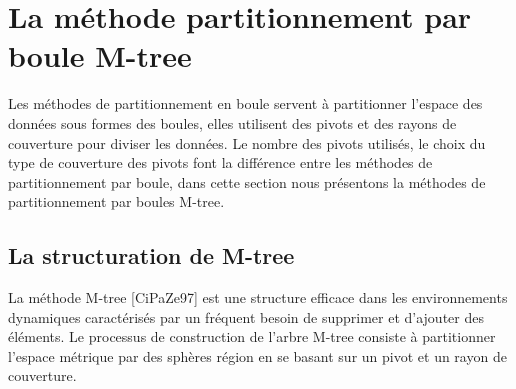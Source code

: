 \section{La méthode partitionnement par boule M-tree}
Les méthodes de partitionnement en boule servent à partitionner l'espace des données sous formes des boules, elles utilisent des pivots et des rayons de couverture pour diviser les données. Le nombre des pivots utilisés, le choix du type de couverture des pivots font la différence entre les méthodes de partitionnement par boule, dans cette section nous présentons la méthodes de partitionnement par boules M-tree.

\subsection{La structuration de M-tree}
La méthode M-tree [CiPaZe97] est une structure efficace dans les environnements dynamiques caractérisés par un fréquent besoin de supprimer et d'ajouter des éléments. Le processus de construction de l'arbre M-tree consiste à partitionner l'espace métrique par des sphères région en se basant sur un pivot et un rayon de couverture. \\

